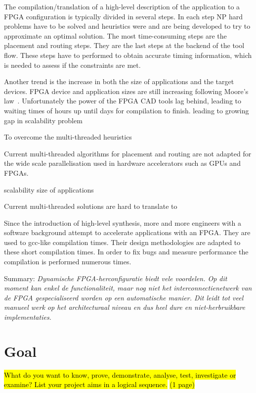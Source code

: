 \documentclass[a4paper,oneside,12pt]{article}
\begin{document}
The compilation/translation of a high-level description of the application to a FPGA configuration is typically divided in several steps. In each step NP hard problems have to be solved and heuristics were and are being developed to try to approximate an optimal solution. The most time-consuming steps are the placement and routing steps. They are the last steps at the backend of the tool flow. These steps have to performed to obtain accurate timing information, which is needed to assess if the constraints are met. 
 
Another trend is the increase in both the size of applications and the target devices. FPGA device and application sizes are still increasing following Moore's law~\cite{shannon2015technology}. Unfortunately the power of the FPGA CAD tools lag behind, leading to waiting times of hours up until days for compilation to finish.
leading to growing gap in 
scalability problem

To overcome the 
multi-threaded heuristics
 
Current multi-threaded algorithms for placement and routing are not adapted for the wide scale parallelisation used in hardware accelerators such as GPUs and FPGAs.


scalability
size of applications

Current multi-threaded solutions are hard to translate to 

Since the introduction of high-level synthesis\cite{}, more and more engineers with a software background attempt to accelerate applications with an FPGA. They are used to gcc-like compilation times. Their design methodologies are adapted to these short compilation times. In order to fix bugs and measure performance the compilation is performed numerous times.

Summary: \emph{Dynamische FPGA-herconfiguratie biedt vele voordelen. Op dit moment kan enkel de functionaliteit, maar nog niet het interconnectienetwerk van de FPGA gespecialiseerd worden op een automatische manier. Dit leidt tot veel manueel werk op het architecturaal niveau en dus heel dure en niet-herbruikbare implementaties.} 

\newpage

\section{Goal}
\hl{What do you want to know, prove, demonstrate, analyse, test, investigate or examine? List your project aims in a logical sequence.}
\hl{(1 page)}
\end{document}
